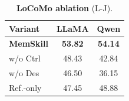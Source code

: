 \begin{table}[h]
    \centering
    \caption{\textbf{LoCoMo ablation} (L-J).}
    \label{tab:ablation_locomo}
    \begin{tabular}{lcc}
        \toprule
        \textbf{Variant} & \textbf{LLaMA} & \textbf{Qwen} \\
        \midrule
        \textbf{MemSkill} & \textbf{53.82} & \textbf{54.14} \\
        \quad w/o Ctrl & 48.43 & 42.84 \\
        \quad w/o Des & 46.50 & 36.15 \\
        \quad Ref.-only & 47.45 & 48.88 \\
        \bottomrule
    \end{tabular}
\end{table}